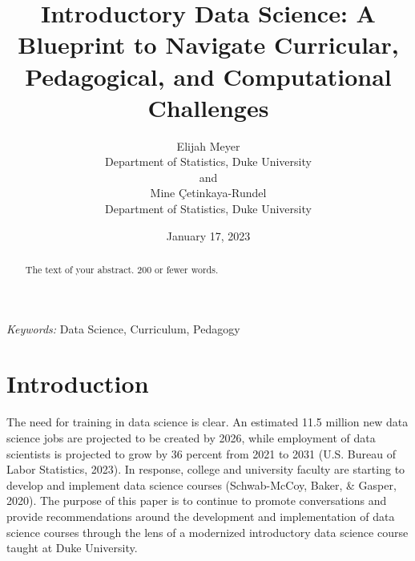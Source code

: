\documentclass[
  12pt]{article}
\begin{document}
\def\spacingset#1{\renewcommand{\baselinestretch}%
{#1}\small\normalsize} \spacingset{1}



\date{January 17, 2023}
\title{\bf Introductory Data Science: A Blueprint to Navigate
Curricular, Pedagogical, and Computational Challenges}
\author{
Elijah Meyer\\
Department of Statistics, Duke University\\
and\\Mine Çetinkaya-Rundel\\
Department of Statistics, Duke University\\
}
\maketitle

\bigskip
\bigskip
\begin{abstract}
The text of your abstract. 200 or fewer words.
\end{abstract}

\noindent%
{\it Keywords:} Data Science, Curriculum, Pedagogy
\vfill

\newpage
\spacingset{1.9} %
\ifdefined\Shaded\renewenvironment{Shaded}{\begin{tcolorbox}[boxrule=0pt, frame hidden, interior hidden, borderline west={3pt}{0pt}{shadecolor}, sharp corners, breakable, enhanced]}{\end{tcolorbox}}\fi

\hypertarget{sec-intro}{%
\section{Introduction}\label{sec-intro}}

The need for training in data science is clear. An estimated 11.5
million new data science jobs are projected to be created by 2026, while
employment of data scientists is projected to grow by 36 percent from
2021 to 2031 (U.S. Bureau of Labor Statistics, 2023). In response,
college and university faculty are starting to develop and implement
data science courses (Schwab-McCoy, Baker, \& Gasper, 2020). The purpose
of this paper is to continue to promote conversations and provide
recommendations around the development and implementation of data
science courses through the lens of a modernized introductory data
science course taught at Duke University.
\end{document}

